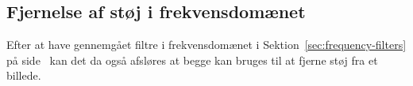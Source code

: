 \subsection{Fjernelse af støj i frekvensdomænet}

Efter at have gennemgået filtre i frekvensdomænet i Sektion~\ref{sec:frequency-filters} på side~\pageref{sec:frequency-filters} kan det da også afsløres at begge kan bruges til at fjerne støj fra et billede.


